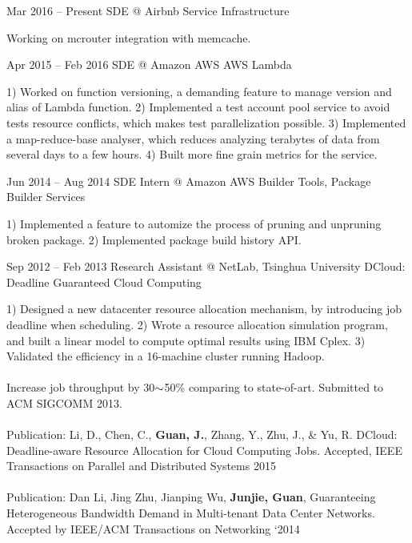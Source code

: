 \documentclass{tccv}
\begin{document}
\begin{eventlist}

\item{Mar 2016 -- Present}
     {SDE @ Airbnb}
     {Service Infrastructure}
     
     Working on mcrouter integration with memcache.
     

\item{Apr 2015 -- Feb 2016}
     {SDE @ Amazon AWS}
     {AWS Lambda}
     
     1) Worked on function versioning, a demanding feature to manage version and alias of Lambda function.  2) Implemented a test account pool service to avoid tests resource conflicts, which makes test parallelization possible. 3) Implemented a map-reduce-base analyser, which reduces analyzing terabytes of data from several days to a few hours. 4) Built more fine grain metrics for the service.

\item{Jun 2014 -- Aug 2014}
     {SDE Intern @ Amazon AWS}
     {Builder Tools, Package Builder Services}
     
    1) Implemented a feature to automize the process of pruning and unpruning broken package. 2) Implemented package build history API.
     
\item{Sep 2012 -- Feb 2013}
     {Research Assistant @ NetLab, Tsinghua University}
     {DCloud: Deadline Guaranteed Cloud Computing}
     
     1) Designed a new datacenter resource allocation mechanism, by introducing job deadline when scheduling. 2) Wrote a resource allocation simulation program, and built a linear model to compute optimal results using IBM Cplex. 3) Validated the efficiency in a 16-machine cluster running Hadoop.
     \\\\
     Increase job throughput by 30$\scriptsize{\sim}$50\% comparing to state-of-art. Submitted to ACM SIGCOMM 2013.
     \\\\
     Publication: Li, D., Chen, C., \textbf{Guan, J.}, Zhang, Y., Zhu, J., \& Yu, R. DCloud: Deadline-aware Resource Allocation for Cloud Computing Jobs. Accepted, IEEE Transactions on Parallel and Distributed Systems 2015
     \\\\
     Publication: Dan Li, Jing Zhu, Jianping Wu, \textbf{Junjie, Guan}, Guaranteeing Heterogeneous Bandwidth Demand in Multi-tenant Data Center Networks. Accepted by IEEE/ACM Transactions on Networking ‘2014


\end{eventlist}
\end{document}
